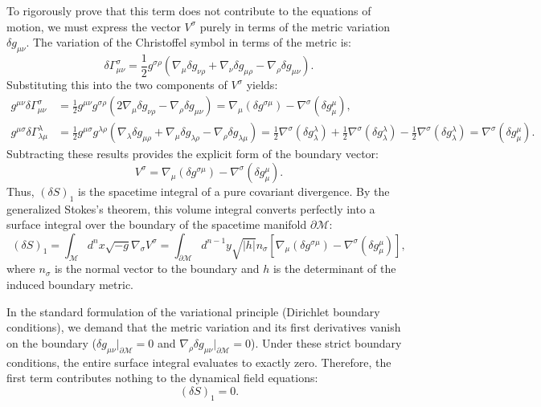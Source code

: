 \documentclass[11pt, a4paper]{report}
\begin{document}
To rigorously prove that this term does not contribute to the equations of motion, we must express the vector $V^{\sigma}$ purely in terms of the metric variation $\delta g_{\mu\nu}$. The variation of the Christoffel symbol in terms of the metric is:
\begin{equation}
\delta\Gamma^{\sigma}_{\mu\nu} = \frac{1}{2} g^{\sigma\rho} \left( \nabla_{\mu}\delta g_{\nu\rho} + \nabla_{\nu}\delta g_{\mu\rho} - \nabla_{\rho}\delta g_{\mu\nu} \right).
\end{equation}
Substituting this into the two components of $V^{\sigma}$ yields:
\begin{align}
g^{\mu\nu}\delta\Gamma^{\sigma}_{\mu\nu} &= \frac{1}{2} g^{\mu\nu} g^{\sigma\rho} \left( 2\nabla_{\mu}\delta g_{\nu\rho} - \nabla_{\rho}\delta g_{\mu\nu} \right) = \nabla_{\mu}(\delta g^{\sigma\mu}) - \nabla^{\sigma}(\delta g^{\mu}_{\mu}), \\
g^{\mu\sigma}\delta\Gamma^{\lambda}_{\lambda\mu} &= \frac{1}{2} g^{\mu\sigma} g^{\lambda\rho} \left( \nabla_{\lambda}\delta g_{\mu\rho} + \nabla_{\mu}\delta g_{\lambda\rho} - \nabla_{\rho}\delta g_{\lambda\mu} \right) = \frac{1}{2} \nabla^{\sigma}(\delta g^{\lambda}_{\lambda}) + \frac{1}{2} \nabla^{\sigma}(\delta g^{\lambda}_{\lambda}) - \frac{1}{2} \nabla^{\sigma}(\delta g^{\lambda}_{\lambda}) = \nabla^{\sigma}(\delta g^{\mu}_{\mu}).
\end{align}
Subtracting these results provides the explicit form of the boundary vector:
\begin{equation}
V^{\sigma} = \nabla_{\mu}(\delta g^{\sigma\mu}) - \nabla^{\sigma}(\delta g^{\mu}_{\mu}).
\end{equation}
Thus, $(\delta S)_{1}$ is the spacetime integral of a pure covariant divergence. By the generalized Stokes's theorem, this volume integral converts perfectly into a surface integral over the boundary of the spacetime manifold $\partial \mathcal{M}$:
\begin{equation}
(\delta S)_{1} = \int_{\mathcal{M}} d^{n}x \sqrt{-g} \nabla_{\sigma} V^{\sigma} = \int_{\partial \mathcal{M}} d^{n-1}y \sqrt{|h|} n_{\sigma} \left[ \nabla_{\mu}(\delta g^{\sigma\mu}) - \nabla^{\sigma}(\delta g^{\mu}_{\mu}) \right],
\end{equation}
where $n_{\sigma}$ is the normal vector to the boundary and $h$ is the determinant of the induced boundary metric.

In the standard formulation of the variational principle (Dirichlet boundary conditions), we demand that the metric variation and its first derivatives vanish on the boundary ($\delta g_{\mu\nu}|_{\partial \mathcal{M}} = 0$ and $\nabla_{\rho}\delta g_{\mu\nu}|_{\partial \mathcal{M}} = 0$). Under these strict boundary conditions, the entire surface integral evaluates to exactly zero. Therefore, the first term contributes nothing to the dynamical field equations:
\begin{equation}
(\delta S)_{1} = 0.
\end{equation}
\end{document}
